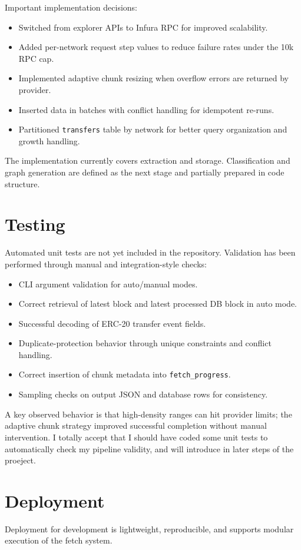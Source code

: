 \documentclass[a4paper,12pt]{report}
\begin{document}
Important implementation decisions:
\begin{itemize}
\item Switched from explorer APIs to Infura RPC for improved scalability.
\item Added per-network request step values to reduce failure rates under the 10k RPC cap.
\item Implemented adaptive chunk resizing when overflow errors are returned by provider.
\item Inserted data in batches with conflict handling for idempotent re-runs.
\item Partitioned \texttt{transfers} table by network for better query organization and growth handling.
\end{itemize}

The implementation currently covers extraction and storage. Classification and graph generation are
defined as the next stage and partially prepared in code structure.

\section{Testing}
Automated unit tests are not yet included in the repository. Validation has been performed through
manual and integration-style checks:
\begin{itemize}
\item CLI argument validation for auto/manual modes.
\item Correct retrieval of latest block and latest processed DB block in auto mode.
\item Successful decoding of ERC-20 transfer event fields.
\item Duplicate-protection behavior through unique constraints and conflict handling.
\item Correct insertion of chunk metadata into \texttt{fetch\_progress}.
\item Sampling checks on output JSON and database rows for consistency.
\end{itemize}

A key observed behavior is that high-density ranges can hit provider limits; the adaptive chunk
strategy improved successful completion without manual intervention. I totally accept that I should have coded some unit tests to automatically check my pipeline validity, and will introduce in later steps of the proeject.

\section{Deployment}
Deployment for development is lightweight, reproducible, and supports modular execution of the fetch system.
\end{document}
